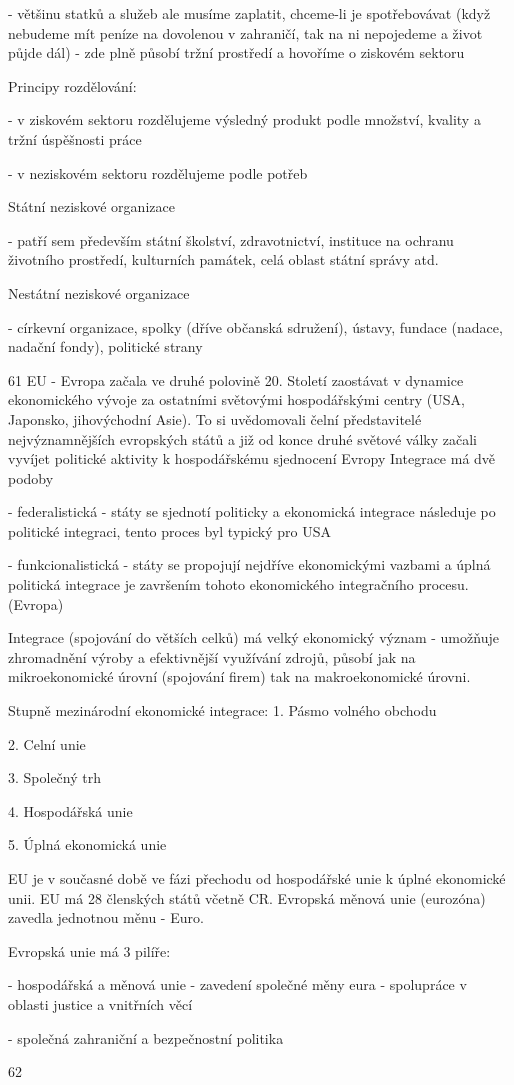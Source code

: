 - většinu statků a služeb ale musíme zaplatit, chceme-li je spotřebovávat (když nebudeme mít
peníze na dovolenou v zahraničí, tak na ni nepojedeme a život půjde dál) - zde plně působí
tržní prostředí a hovoříme o ziskovém sektoru

Principy rozdělování:

- v ziskovém sektoru rozdělujeme výsledný produkt podle množství, kvality a tržní úspěšnosti
práce

- v neziskovém sektoru rozdělujeme podle potřeb

Státní neziskové organizace

- patří sem především státní školství, zdravotnictví, instituce na ochranu životního prostředí,
kulturních památek, celá oblast státní správy atd.

Nestátní neziskové organizace

- církevní organizace, spolky (dříve občanská sdružení), ústavy, fundace (nadace, nadační
fondy), politické strany

61
\newpage
EU - Evropa začala ve druhé polovině 20. Století zaostávat v dynamice ekonomického
vývoje za ostatními světovými hospodářskými centry (USA, Japonsko, jihovýchodní Asie).
To si uvědomovali čelní představitelé nejvýznamnějších evropských států a již od konce
druhé světové války začali vyvíjet politické aktivity k hospodářskému sjednocení Evropy
Integrace má dvě podoby

- federalistická - státy se sjednotí politicky a ekonomická integrace následuje po politické
integraci, tento proces byl typický pro USA

- funkcionalistická - státy se propojují nejdříve ekonomickými vazbami a úplná politická
integrace je završením tohoto ekonomického integračního procesu. (Evropa)





Integrace (spojování do větších celků) má velký ekonomický význam - umožňuje
zhromadnění výroby a efektivnější využívání zdrojů, působí jak na mikroekonomické úrovní
(spojování firem) tak na makroekonomické úrovni.

Stupně mezinárodní ekonomické integrace:
1. Pásmo volného obchodu

2. Celní unie

3. Společný trh

4. Hospodářská unie

5. Úplná ekonomická unie

EU je v současné době ve fázi přechodu od hospodářské unie k úplné ekonomické unii. EU má 28 členských států včetně CR. Evropská měnová unie (eurozóna) zavedla jednotnou měnu - Euro.

Evropská unie má 3 pilíře:

- hospodářská a měnová unie - zavedení společné měny eura
- spolupráce v oblasti justice a vnitřních věcí

- společná zahraniční a bezpečnostní politika

62
\newpage